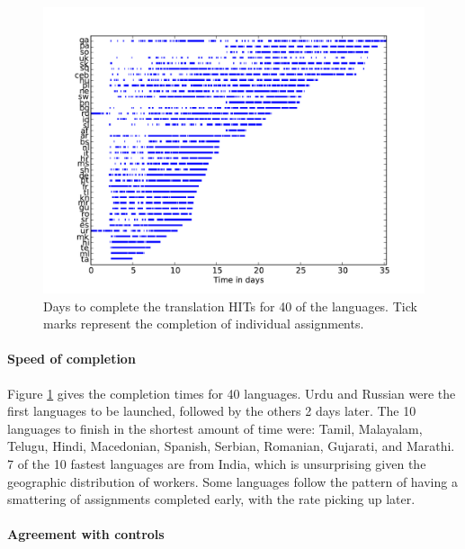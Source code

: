 \documentclass[11pt]{article}
\begin{document}
\begin{figure}[h]
\centering
\includegraphics[height=\linewidth,angle=270]{figures/completiontime-new}
\caption{Days to complete the translation HITs for 40 of the languages. Tick marks represent the completion of individual assignments. }
\label{completion-time}
\end{figure}

\paragraph{Speed of completion}

Figure \ref{completion-time} gives the completion times for 40 languages.  
Urdu and Russian were the first languages to be launched, followed by the others 2 days later. The 10 languages to finish in the shortest amount of time were: Tamil, Malayalam, Telugu, Hindi, Macedonian, Spanish, Serbian, Romanian, Gujarati, and Marathi. 7 of the 10 fastest languages are from India, which is unsurprising given the geographic distribution of workers.  Some languages follow the pattern of having a smattering of assignments completed early, with the rate picking up later. 


\paragraph{Agreement with controls}
\end{document}
